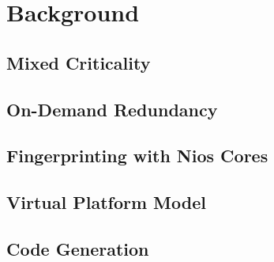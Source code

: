
\chapter{Background} %

\label{c:background} %


\section{Mixed Criticality}
\section{On-Demand Redundancy}
\section{Fingerprinting with Nios Cores}


 
\section{Virtual Platform Model}

\section{Code Generation}